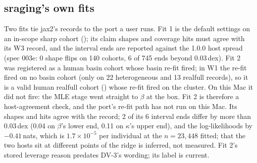 \subsection{sraging's own fits}\label{sec:gate-cross}
Two fits tie jax2's records to the port a user runs. Fit 1 is the default settings on an in-scope sharp cohort
(); its claim shapes and coverage hits must agree with its W3 record, and the interval
ends are reported against the 1.0.0 host spread (spec 003e: 0 shape flips on 140 cohorts, 6 of 745 ends beyond
0.03\,dex). Fit 2 was registered as a human basin cohort whose basin re-fit fired; in W1 the re-fit fired on no basin
cohort (only on 22 heterogeneous and 13 realfull records), so it is a valid human realfull cohort
() whose re-fit fired on the cluster. On this Mac it did not fire: the
MLE stage went straight to $\beta$ at the box. Fit 2 is therefore a host-agreement check, and the port's re-fit path
has not run on this Mac. Its shapes and hits agree with the record; 2 of its 6 interval ends differ by more than
0.03\,dex (0.04 on $\beta$'s lower end, 0.11 on $\kappa$'s upper end), and the log-likelihoods by $-0.41$\,nats, which is
$1.7\times10^{-5}$ per individual at the $n=23{,}448$ fitted; that the two hosts sit at different points of the ridge is inferred,
not measured. Fit 2's stored leverage reason predates DV-3's wording; its label is current.

